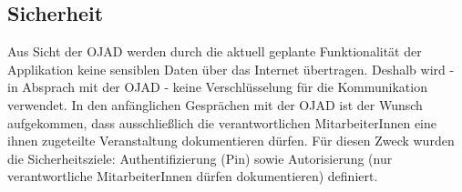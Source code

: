 \documentclass[Bachelorarbeit.tex]{subfiles}
\begin{document}
\subsection*{Sicherheit}
\label{subsec:sicherheit}

Aus Sicht der \ac{OJAD} werden durch die aktuell geplante Funktionalität der Applikation keine sensiblen Daten über das Internet übertragen. 
Deshalb wird - in Absprach mit der \ac{OJAD} - keine Verschlüsselung für die Kommunikation verwendet.
In den anfänglichen Gesprächen mit der \ac{OJAD} ist der Wunsch aufgekommen, dass ausschließlich die verantwortlichen MitarbeiterInnen eine ihnen zugeteilte Veranstaltung dokumentieren dürfen. 
Für diesen Zweck wurden die Sicherheitsziele: Authentifizierung (Pin) sowie Autorisierung (nur verantwortliche MitarbeiterInnen dürfen dokumentieren) definiert.
\end{document}
